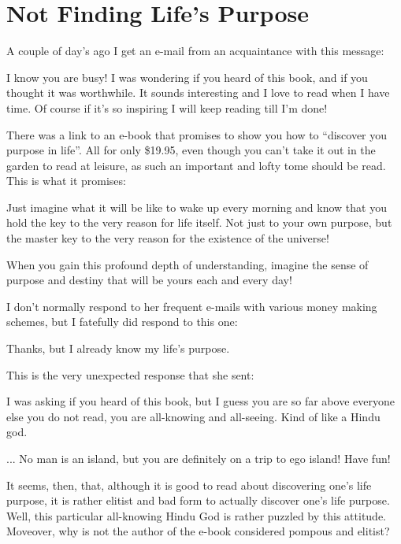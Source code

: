\section{Not Finding Life’s Purpose}

A couple of day's ago I get an e-mail from an acquaintance with this message:

\begin{quotex}
I know you are busy! I was wondering if you heard of this book, and if you thought it was worthwhile. It sounds interesting and I love to read when I have time. Of course if it's so inspiring I will keep reading till I'm done!
\end{quotex}


There was a link to an e-book that promises to show you how to ``discover you purpose in life''. All for only \$19.95, even though you can't take it out in the garden to read at leisure, as such an important and lofty tome should be read. This is what it promises:

\begin{quotationx}
Just imagine what it will be like to wake up every morning and know that you hold the key to the very reason for life itself. Not just to your own purpose, but the master key to the very reason for the existence of the universe!

When you gain this profound depth of understanding, imagine the sense of purpose and destiny that will be yours each and every day!
\end{quotationx}


I don't normally respond to her frequent e-mails with various money making schemes, but I fatefully did respond to this one:

\begin{quotex}
Thanks, but I already know my life's purpose.
\end{quotex}


This is the very unexpected response that she sent:

\begin{quotex}
I was asking if you heard of this book, but I guess you are so far above everyone else you do not read, you are all-knowing and all-seeing. Kind of like a Hindu god.

... No man is an island, but you are definitely on a trip to ego island! Have fun!
\end{quotex}

It seems, then, that, although it is good to read about discovering one's life purpose, it is rather elitist and bad form to actually discover one's life purpose. Well, this particular all-knowing Hindu God is rather puzzled by this attitude. Moveover, why is not the author of the e-book considered pompous and elitist?

